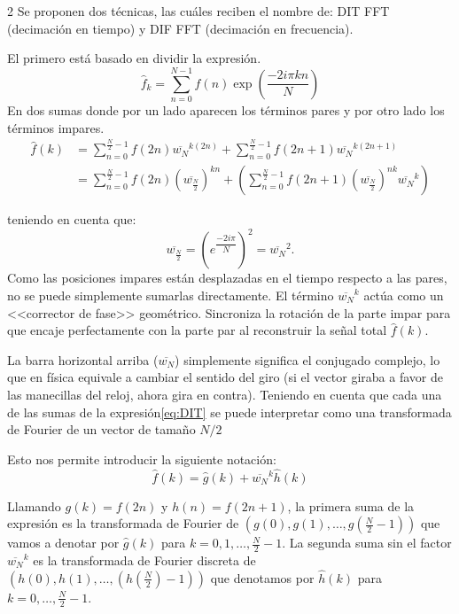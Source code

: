 \documentclass[10pt]{article}
\begin{document}
\begin{multicols}{2}
Se proponen dos técnicas, las cuáles reciben el nombre de: DIT FFT (decimación en tiempo) y DIF FFT (decimación en frecuencia).

El primero  está basado en dividir la expresión.
\begin{equation}
    \widehat{f}_k = \sum_{n=0}^{N-1} f(n) \exp\left( \frac{-2i\pi kn}{N} \right)
    \label{FFT}
\end{equation}
En dos sumas donde por un lado aparecen los términos pares y por otro lado los términos impares.
\begin{equation}
\begin{aligned}
\widehat{f}(k) &= \sum_{n=0}^{\frac{N}{2}-1} f(2n)\overline{w_N}^{k(2n)} + \sum_{n=0}^{\frac{N}{2}-1} f(2n+1)\overline{w_N}^{k(2n+1)} \\
&= \sum_{n=0}^{\frac{N}{2}-1} f(2n)\left(\overline{w_{\frac{N}{2}}}\right)^{kn} + \left( \sum_{n=0}^{\frac{N}{2}-1} f(2n+1)\left(\overline{w_{\frac{N}{2}}}\right)^{nk}\overline{w_N}^k \right)
\end{aligned}
\label{eq:DIT}
\end{equation}

teniendo en cuenta que: 
\begin{equation}
    \overline{w_{\frac{N}{2}}} = \left( e^{\dfrac{-2i\pi}{N}} \right)^2 = \overline{w_N}^2.
\end{equation}
Como las posiciones impares están desplazadas en el tiempo respecto a las pares, no se puede simplemente sumarlas directamente. El término $\overline{w_N}^k$ actúa como un <<corrector de fase>> geométrico. Sincroniza la rotación de la parte impar para que encaje perfectamente con la parte par al reconstruir la señal total $\widehat{f}(k)$.

La barra horizontal arriba ($\overline{w_N}$) simplemente significa el  conjugado complejo, lo que en física equivale a cambiar el sentido del giro  (si el vector giraba a favor de las manecillas del reloj, ahora gira en contra).
Teniendo en cuenta que cada una de las sumas de la expresión\eqref{eq:DIT}  se puede interpretar como una transformada de Fourier de un vector de tamaño $N/2$

Esto nos permite introducir la siguiente notación:
\begin{equation}
    \widehat{f}(k) = \widehat{g}(k) + \overline{w_N}^k \widehat{h}(k)
    \label{eq:fft_cooley_tukey}
\end{equation}

Llamando $g(k) = f(2n)$ y $h(n) = f(2n + 1)$, la primera suma de la expresión es la transformada de Fourier de $(g(0), g(1), \dots, g(\frac{N}{2} - 1))$ que vamos a denotar por $\widehat{g}(k)$ para $k = 0, 1, \dots, \frac{N}{2} - 1$. La segunda suma sin el factor $\overline{w_N}^k$ es la transformada de Fourier discreta de $(h(0), h(1), \dots, (h(\frac{N}{2}) - 1))$ que denotamos por $\widehat{h}(k)$ para $k = 0, \dots, \frac{N}{2} - 1$.



\end{multicols}
\end{document}
